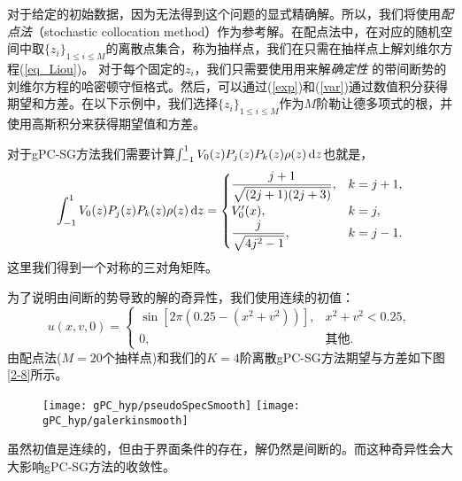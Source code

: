 对于给定的初始数据，因为无法得到这个问题的显式精确解。所以，我们将使用{\it 配点法}（stochastic collocation method）作为参考解。在配点法中，在对应的随机空间中取$\{z_i\}_{1\leq i\leq M}$的离散点集合，称为抽样点，我们在只需在抽样点上解刘维尔方程(\ref{eq_Liou})。 对于每个固定的$z_i$，我们只需要使用用来解{\it 确定性} 的带间断势的刘维尔方程的哈密顿守恒格式。然后，可以通过(\ref{exp})和(\ref{var})通过数值积分获得期望和方差。在以下示例中，我们选择$\{z_i\}_{1\leq i\leq M}$作为$M$阶勒让德多项式的根，并使用高斯积分来获得期望值和方差。

对于gPC-SG方法我们需要计算$\int_{-1}^1 V_0(z)P_j(z)P_k(z) \rho(z)\mathop{}\!\mathrm{d} z$也就是，
\begin{equation}
  \int_{-1}^1 V_0(z)P_j(z)P_k(z) \rho(z)\mathop{}\!\mathrm{d} z =
  \begin{cases}
    \dfrac{j+1}{\sqrt{(2j+1)(2j+3)}}, &k=j+1, \\
    V'_0(x), &k=j, \\
    \dfrac{j}{\sqrt{4j^2-1}}, &k=j-1.
  \end{cases}
\end{equation}
这里我们得到一个对称的三对角矩阵。

为了说明由间断的势导致的解的奇异性，我们使用连续的初值：
\begin{equation}
  u(x,v,0)=
  \begin{cases}
  \sin[2\pi(0.25-(x^2+v^2))], &x^2+v^2<0.25, \\
  0, &\text{其他}.
  \end{cases}
\label{ex2-init2}
\end{equation}
由配点法($M=20$个抽样点)和我们的$K=4$阶离散gPC-SG方法期望与方差如下图\ref{2-8}所示。
\begin{figure}[htbp]
  \texttt{[image: gPC\_hyp/pseudoSpecSmooth]}
  \texttt{[image: gPC\_hyp/galerkinsmooth]}
\end{figure}
虽然初值是连续的，但由于界面条件的存在，解仍然是间断的。而这种奇异性会大大影响gPC-SG方法的收敛性。


